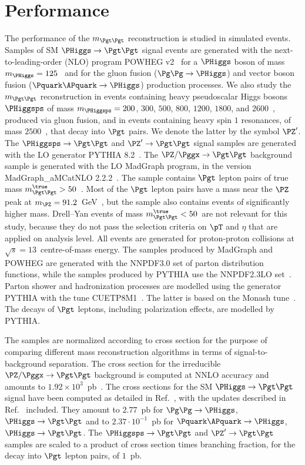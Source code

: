 \section{Performance}
\label{sec:performance}

The performance of the $m_{\Pgt\Pgt}$ reconstruction is studied in simulated events.
Samples of SM $\PHiggs \to \Pgt\Pgt$ signal events
are generated with the next-to-leading-order (NLO) program POWHEG v2~\cite{POWHEG1,POWHEG2,POWHEG3}
for a $\PHiggs$ boson of mass $m_{\PHiggs} = 125$~\GeV 
and for the gluon fusion ($\Pg\Pg \to \PHiggs$) and vector boson fusion ($\Pquark\APquark \to \PHiggs$) production processes.
We also study the $m_{\Pgt\Pgt}$ reconstruction in events containing
heavy pseudoscalar Higgs bosons $\PHiggsps$ of mass $m_{\PHiggsps} = 200$, $300$, $500$, $800$, $1200$, $1800$, and $2600$~\GeV,
produced via gluon fusion, and in events containing heavy spin $1$
resonances, of mass $2500$~\GeV, that decay into $\Pgt$ pairs.
We denote the latter by the symbol $\PZ'$. 
The $\PHiggsps \to \Pgt\Pgt$ and $\PZ' \to \Pgt\Pgt$ signal samples are generated with the LO generator PYTHIA 8.2~\cite{pythia8}.
The $\PZ/\Pggx \to \Pgt\Pgt$ background sample is generated with the LO MadGraph program, in the version MadGraph\_aMCatNLO 2.2.2~\cite{MadGraph_aMCatNLO}.
The sample contains $\Pgt$ lepton pairs of true mass $m_{\Pgt\Pgt}^{\true} > 50$~\GeV.
Most of the $\Pgt$ lepton pairs have a mass near the $\PZ$ peak at $m_{\PZ} = 91.2$~GeV~\cite{PDG}, 
but the sample also contains events of significantly higher mass.
Drell--Yan events of mass $m_{\Pgt\Pgt}^{\true} < 50$~\GeV are not relevant for this study, 
because they do not pass the selection criteria on $\pT$ and $\eta$ that are applied on analysis level.
All events are generated for proton-proton collisions at $\sqrt{s} = 13$~\TeV centre-of-mass energy.
The samples produced by MadGraph and POWHEG are generated with the NNPDF3.0 set of parton distribution functions,
while the samples produced by PYTHIA use the NNPDF2.3LO set~\cite{NNPDF1,NNPDF2,NNPDF3}.
Parton shower and hadronization processes are modelled using the generator PYTHIA with the tune CUETP8M1~\cite{PYTHIA_CUETP8M1tune_CMS}.
The latter is based on the Monash tune~\cite{PYTHIA_MonashTune}.
The decays of $\Pgt$ leptons, including polarization effects, are modelled by PYTHIA.

The samples are normalized according to cross section for the purpose of comparing different mass reconstruction algorithms in terms of signal-to-background separation.
The cross section for the irreducible $\PZ/\Pggx \to \Pgt\Pgt$ background is computed at NNLO accuracy and amounts to $1.92 \times 10^{3}$~pb~\cite{FEWZ}.
The cross sections for the SM $\PHiggs \to \Pgt\Pgt$ signal have been computed as detailed in Ref.~\cite{Dittmaier:2011ti},
with the updates described in Ref.~\cite{Heinemeyer:2013tqa} included.
They amount to $2.77$~pb for $\Pg\Pg \to \PHiggs$, $\PHiggs \to \Pgt\Pgt$ and to $2.37 \cdot 10^{-1}$~pb for $\Pquark\APquark \to \PHiggs$, $\PHiggs \to \Pgt\Pgt$.
The $\PHiggsps \to \Pgt\Pgt$ and $\PZ' \to \Pgt\Pgt$ samples 
are scaled to a product of cross section times branching fraction, for the decay into $\Pgt$ lepton pairs, of $1$~pb.

